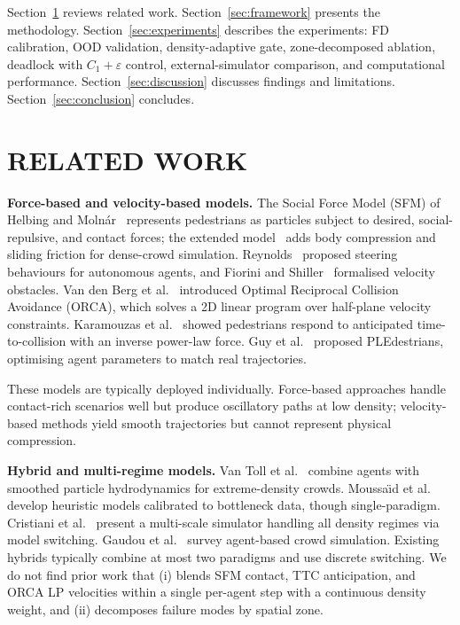 \documentclass[a4paper,twoside]{article}
\begin{document}
Section~\ref{sec:related} reviews related work. Section~\ref{sec:framework} presents the methodology. Section~\ref{sec:experiments} describes the experiments: FD calibration, OOD validation, density-adaptive gate, zone-decomposed ablation, deadlock with $C_1+\varepsilon$ control, external-simulator comparison, and computational performance. Section~\ref{sec:discussion} discusses findings and limitations. Section~\ref{sec:conclusion} concludes.


\section{\uppercase{Related Work}}
\label{sec:related}

\textbf{Force-based and velocity-based models.}
The Social Force Model (SFM) of Helbing and Moln\'{a}r~\cite{Helbing95} represents pedestrians as particles subject to desired, social-repulsive, and contact forces; the extended model~\cite{Helbing00} adds body compression and sliding friction for dense-crowd simulation. Reynolds~\cite{Reynolds99} proposed steering behaviours for autonomous agents, and Fiorini and Shiller~\cite{Fiorini98} formalised velocity obstacles. Van den Berg et al.~\cite{VandenBerg11} introduced Optimal Reciprocal Collision Avoidance (ORCA), which solves a 2D linear program over half-plane velocity constraints. Karamouzas et al.~\cite{Karamouzas14} showed pedestrians respond to anticipated time-to-collision with an inverse power-law force. Guy et al.~\cite{Guy10} proposed PLEdestrians, optimising agent parameters to match real trajectories.

These models are typically deployed individually. Force-based approaches handle contact-rich scenarios well but produce oscillatory paths at low density; velocity-based methods yield smooth trajectories but cannot represent physical compression.

\textbf{Hybrid and multi-regime models.}
Van Toll et al.~\cite{VanToll21} combine agents with smoothed particle hydrodynamics for extreme-density crowds. Moussa\"{\i}d et al.~\cite{Moussaid11} develop heuristic models calibrated to bottleneck data, though single-paradigm. Cristiani et al.~\cite{Cristiani23} present a multi-scale simulator handling all density regimes via model switching. Gaudou et al.~\cite{Gaudou24} survey agent-based crowd simulation. Existing hybrids typically combine at most two paradigms and use discrete switching. We do not find prior work that (i) blends SFM contact, TTC anticipation, and ORCA LP velocities within a single per-agent step with a continuous density weight, and (ii) decomposes failure modes by spatial zone.
\end{document}
